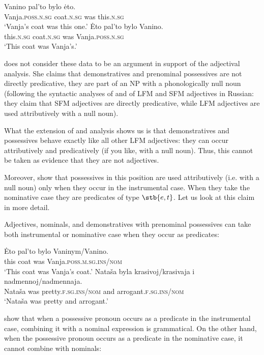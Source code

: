 \documentclass[output=paper,
colorlinks,
citecolor=brown,
newtxmath
]{langscibook}
\begin{document}

\ea
    \ea \gll Vanino pal'to bylo ėto.\\
    Vanja.\textsc{poss.n.sg} coat.\textsc{n.sg} was this.\textsc{n.sg}\\
    \glt `Vanja's coat was this one.'
    \ex \gll Ėto pal'to bylo Vanino.\\
    this.\textsc{n.sg} coat.\textsc{n.sg} was Vanja.\textsc{poss.n.sg}\\
    \glt `This coat was Vanja's.'
\z\z

\noindent \citet{Pereltsvaig2007} does not consider these data to be an argument in support of the adjectival analysis. She claims that demonstratives and prenominal possessives are not directly predicative, they are part of an NP with a phonologically null noun (following the syntactic analyses of \citealt{Babby1975} and \citealt{Bailyn1994} of LFM and SFM adjectives in Russian: they claim that SFM adjectives are directly predicative, while LFM adjectives are used attributively with a null noun).

What the extension of  and  analysis shows us is that demonstratives and possessives behave exactly like all other LFM adjectives: they can occur attributively and predicatively (if you like, with a null noun). Thus, this cannot be taken as evidence that they are not adjectives. 

Moreover, \citet{Partee.Borschev2003} show that possessives in this position are used attributively (i.e. with a null noun) only when they occur in the instrumental case. When they take the nominative case they are predicates of type $\stb{e,t}$. Let us look at this claim in more detail. 

Adjectives, nominals, and demonstratives with prenominal possessives can take both instrumental or nominative case when they occur as predicates:


\ea
    \ea \gll Ėto pal'to bylo Vaninym/Vanino.\\
    this coat was Vanja.\textsc{poss.m.sg.ins/nom}\\
    \glt `This coat was Vanja's coat.'
    \ex \gll Nataša byla krasivoj/krasivaja i nadmennoj/nadmennaja.\\
    Nataša was pretty.\textsc{f.sg.ins/nom} and arrogant.\textsc{f.sg.ins/nom}\\
    \glt `Nataša was pretty and arrogant.'
\z\z

\noindent \citeauthor{Partee.Borschev2003} show that when a possessive pronoun occurs as a predicate in the instrumental case, combining it with a nominal expression is grammatical. On the other hand, when the possessive pronoun occurs as a predicate in the nominative case, it cannot combine with nominals: 
\end{document}
